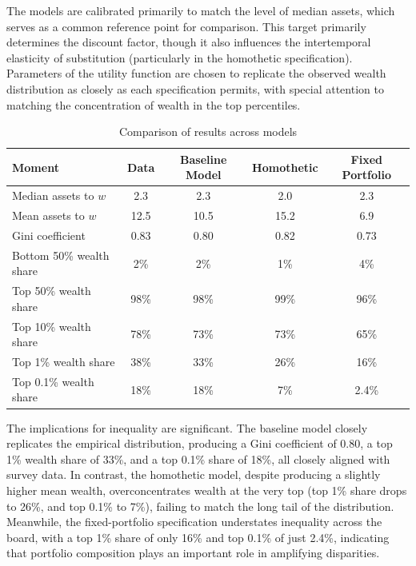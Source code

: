 \documentclass[12pt]{article}
\begin{document}
The models are calibrated primarily to match the level of median assets, which serves as a common reference point for comparison. This target primarily determines the discount factor, though it also influences the intertemporal elasticity of substitution (particularly in the homothetic specification). Parameters of the utility function are chosen to replicate the observed wealth distribution as closely as each specification permits, with special attention to matching the concentration of wealth in the top percentiles.

\begin{table}[htbp]
\centering
\caption{Comparison of results across models}
\label{tab:results_comparison}
\begin{tabular}{@{} lcccc @{}}
\toprule
\textbf{Moment} & \textbf{Data} & \textbf{Baseline Model} & \textbf{Homothetic} & \textbf{Fixed Portfolio} \\
\midrule
Median assets to $w$     & 2.3  & 2.3   & 2.0   & 2.3   \\
Mean assets to $w$       & 12.5 & 10.5  & 15.2  & 6.9   \\
Gini coefficient         & 0.83 & 0.80  & 0.82  & 0.73  \\
Bottom 50\% wealth share & 2\%  & 2\%   & 1\%   & 4\%   \\
Top 50\% wealth share    & 98\% & 98\%  & 99\%  & 96\%  \\
Top 10\% wealth share    & 78\% & 73\%  & 73\%  & 65\%  \\
Top 1\% wealth share     & 38\% & 33\%  & 26\%  & 16\%  \\
Top 0.1\% wealth share   & 18\% & 18\%  & 7\%   & 2.4\% \\
\bottomrule
\end{tabular}
\vspace{0.5em}
\end{table}

The implications for inequality are significant. The baseline model closely replicates the empirical distribution, producing a Gini coefficient of 0.80, a top 1\% wealth share of 33\%, and a top 0.1\% share of 18\%, all closely aligned with survey data. In contrast, the homothetic model, despite producing a slightly higher mean wealth, overconcentrates wealth at the very top (top 1\% share drops to 26\%, and top 0.1\% to 7\%), failing to match the long tail of the distribution. Meanwhile, the fixed-portfolio specification understates inequality across the board, with a top 1\% share of only 16\% and top 0.1\% of just 2.4\%, indicating that portfolio composition plays an important role in amplifying disparities.
\end{document}
